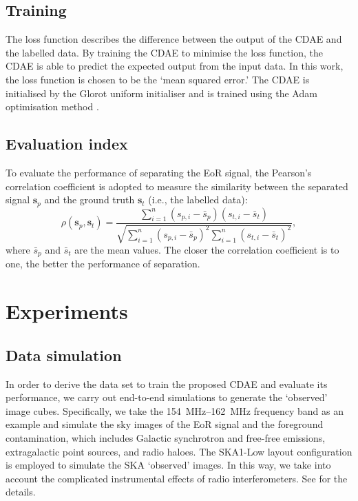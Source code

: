 \documentclass[letters,a4paper,fleqn,usenatbib]{mnras}
\begin{document}
\subsection{Training}
\label{sec:training}

The loss function describes the difference between the output of the
CDAE and the labelled data.
By training the CDAE to minimise the loss function, the CDAE is able
to predict the expected output from the input data.
In this work, the loss function is chosen to be the `mean squared error.'
The CDAE is initialised by the Glorot uniform initialiser \citep{glorot2010}
and is trained using the Adam optimisation method \citep{kingma2015}.


\subsection{Evaluation index}
\label{sec:index}

To evaluate the performance of separating the EoR signal, the Pearson's
correlation coefficient is adopted to measure the similarity between
the separated signal $\mathbf{s}_p$ and the ground truth $\mathbf{s}_t$
(i.e., the labelled data):
\begin{equation}
  \label{eq:corrcoef}
  \rho(\mathbf{s}_p, \mathbf{s}_t) =
    \frac{\sum_{i=1}^{n}(s_{p,i}-\bar{s}_p)(s_{t,i}-\bar{s}_t)}{
      \sqrt{\sum_{i=1}^{n}(s_{p,i}-\bar{s}_p)^2
        \sum_{i=1}^{n}(s_{t,i}-\bar{s}_t)^2}
    },
\end{equation}
where $\bar{s}_p$ and $\bar{s}_t$ are the mean values.
The closer the correlation coefficient is to one, the better the
performance of separation.


\section{Experiments}
\label{sec:experiments}

\subsection{Data simulation}
\label{sec:simulation}

In order to derive the data set to train the proposed CDAE and evaluate
its performance, we carry out end-to-end simulations to generate the
`observed' image cubes.
Specifically, we take the \SIrange{154}{162}{\MHz} frequency band as an
example and simulate the sky images of the EoR signal and the foreground
contamination, which includes Galactic synchrotron and free-free
emissions, extragalactic point sources, and radio haloes.
The SKA1-Low layout configuration is employed to simulate the SKA
`observed' images.
In this way, we take into account the complicated instrumental effects
of radio interferometers.
See \citet{li2018} for the details.
\end{document}
